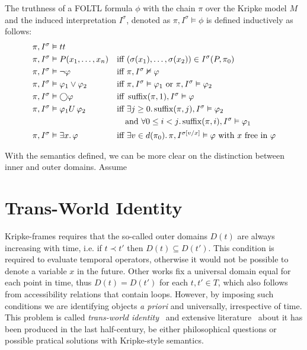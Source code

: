 \begin{definition}
  The truthness of a \ac{FOLTL} formula $\phi$ with the chain $\pi$ over the Kripke model $M$ and the induced
  interpretation $I^\sigma$, denoted as $\pi, I^\sigma \vDash \phi$ is defined inductively as follows:
  \begin{align*}
    \pi, I^\sigma &\vDash tt && \\
    \pi, I^\sigma &\vDash P(x_1, \ldots, x_n) &&\text{iff } (\sigma(x_1), \ldots, \sigma(x_2)) \in I^\sigma(P, \pi_0) \\
    \pi, I^\sigma &\vDash \neg\varphi &&\text{iff } \pi, I^\sigma \nvDash \varphi \\
    \pi, I^\sigma &\vDash \varphi_1 \lor \varphi_2 &&\text{iff } \pi, I^\sigma \vDash \varphi_1 \text{ or } \pi, I^\sigma
      \vDash \varphi_2 \\
    \pi, I^\sigma &\vDash \bigcirc{\varphi} &&\text{iff } \operatorname{suffix}(\pi, 1), I^\sigma \vDash \varphi \\
    \pi, I^\sigma &\vDash {\varphi_1}U\,{\varphi_2} &&\text{iff } \exists {j \geq 0} \ldotp {\operatorname{suffix}(\pi, j), I^\sigma \vDash \varphi_2} \\
    &&&\quad\text{and } \forall {0 \leq i < j} \ldotp {\operatorname{suffix}(\pi, i), I^\sigma \vDash \varphi_1} \\
    \pi, I^\sigma &\vDash \exists {x} \ldotp {\varphi} &&\text{iff } \exists {v \in d(\pi_0)} \ldotp {\pi, I^{\sigma[v/x]} \vDash \varphi}
    \text{ with $x$ free in $\varphi$} \\
  \end{align*}
\end{definition}

With the semantics defined, we can be more clear on the distinction between inner and outer domains. Assume 

\section{Trans-World Identity}

Kripke-frames requires that the so-called outer domains $D(t)$ are always increasing with time, i.e. if $t \prec t'$
then $D(t) \subseteq D(t')$. This condition is required to evaluate temporal operators, otherwise it would not be
possible to denote a variable $x$ in the future. Other works fix a universal domain equal for each point in time, thus
$D(t) = D(t')$ for each $t, t' \in T$, which also follows from accessibility relations that contain loops.  However, by
imposing such conditions we are identifying objects \emph{a priori} and universally, irrespective of time. This problem is
called \emph{trans-world identity}~\cite{lewis_counterpart_1968,lewis_plurality_2001} and extensive
literature~\cite{belardinelli_quantified_2021,plantinga_transworld_1978,kripke_naming_1998} about it has been produced
in the last half-century, be either philosophical questions or possible pratical solutions with Kripke-style semantics.

